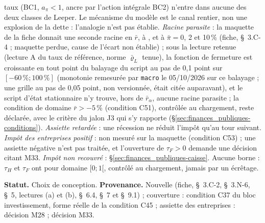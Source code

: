 \documentclass[11pt,a4paper]{article}
\newcommand{\barre}[1]{\leavevmode\sbox{\boitebarre}{#1}\rlap{\rule[0.6ex]{\wd\boitebarre}{0.4pt}}\usebox{\boitebarre}}
\begin{document}
\begin{proposee}
taux (BC1, $a_\pi < 1$, ancre par l'action intégrale BC2) n'entre dans aucune des deux classes de Leeper. Le mécanisme du modèle est le canal rentier, non une explosion de la dette : l'analogie n'est pas établie. \emph{Racine parasite} : la maquette de la fiche donnait une seconde racine en $\bar r$, à \barre{$-20{,}63$}, \barre{$-26{,}65$} et \barre{$-40{,}49\,\%$} à $\bar\pi = 0$, 2 et 10\,\% (fiche, \S~3.C-4 ; maquette perdue, cause de l'écart non établie) ; sous la lecture retenue (lecture A du taux de référence, norme $\bar\varrho_L$ tenue), la fonction de fermeture est croissante en tout point du balayage du script au pas de 0,1 point sur $[-60\,\% ; 100\,\%]$ (monotonie remesurée par \texttt{macro} le 05/10/2026 sur ce balayage ; une grille au pas de 0,05 point, non versionnée, était citée auparavant), et le script d'état stationnaire n'y trouve, hors de $\bar r_\alpha$, aucune racine parasite ; la condition de domaine $\bar r > -5\,\%$ (condition C51), contrôlée au chargement, reste déclarée, avec le critère du jalon J3 qui s'y rapporte (\S\ref{sec:finances_publiques-conditions}). \emph{Assiette retardée} : une récession ne réduit l'impôt qu'au tour suivant. \emph{Impôt des entreprises positif} : non mesuré sur la maquette (condition C53) ; une assiette négative n'est pas traitée, et l'ouverture de $\tau_F > 0$ demande une décision citant M33. \emph{Impôt non recouvré} : \S\ref{sec:finances_publiques-caisse}. Aucune borne : $\tau_H$ et $\tau_F$ ont pour domaine $[0 ; 1[$, contrôlé au chargement, jamais par un écrêtage.

\textbf{Statut.} Choix de conception. \textbf{Provenance.} Nouvelle (fiche, \S~3.C-2, \S~3.N-6, \S~5, lectures (a) et (b), \S~6.4, \S~7 et \S~9.1) ; couverture : condition C37 du bloc investissement, forme réelle de la condition C45 ; assiette des entreprises : décision M28 ; décision M33.
\end{proposee}
\end{document}
